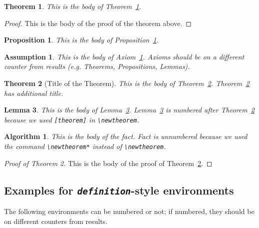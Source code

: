 \documentclass[qe,nameyear,final,supplement,openaccess]{econsocart}
\theoremstyle{plain}
\newtheorem{theorem}{Theorem}[section]
\newtheorem{lemma}[theorem]{Lemma}
\newtheorem{proposition}{Proposition}[section]
\newtheorem{axiom}{Axiom}[section]
\newtheorem{observation}{Observation}[section]
\newtheorem{axiom}[axiom]{Assumption}%
\newtheorem{observation}[observation]{Algorithm}%
\begin{document}
\begin{theorem}\label{th1}This is the body of Theorem~\ref{th1}.

\end{theorem}\begin{proof}This is the body of the proof of the theorem above.

\end{proof}\begin{proposition}\label{cl1}This is the body of Proposition~\ref{cl1}.

\end{proposition}\begin{axiom}\label{ax1}This is the body of Axiom~\ref{ax1}. Axioms should be on a different counter from results (e.g. Theorems, Propositions, Lemmas).

\end{axiom}\begin{theorem}[Title of the Theorem]\label{th2}This is the body of Theorem~\ref{th2}. Theorem~\ref{th2} has additional title.

\end{theorem}\begin{lemma}\label{le1}This is the body of Lemma~\ref{le1}. Lemma~\ref{le1} is numbered after
Theorem~\ref{th2} because we used \texttt{[theorem]} in \texttt{{\textbackslash}newtheorem}.

\end{lemma}\begin{observation}This is the body of the fact. Fact is unnumbered because we used the command \texttt{{\textbackslash}newtheorem*}
instead of \texttt{{\textbackslash}newtheorem}.

\end{observation}\begin{proof}[Proof of Theorem 2]This is the body of the proof of Theorem~\ref{th2}.

\end{proof}\subsection{Examples for \textit{\texttt{definition}}-style environments}

The following environments can be numbered or not; if numbered, they should be on different counters from results.
\end{document}
